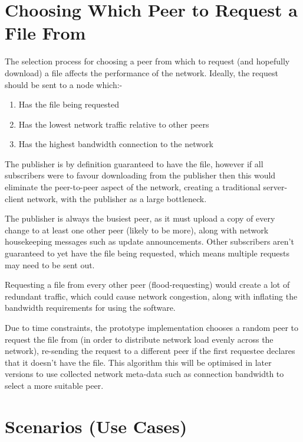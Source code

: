 \documentclass[12pt,a4paper,]{adreport}
\begin{document}
\section{Choosing Which Peer to Request a File
From}\label{choosing-which-peer-to-request-a-file-from}

The selection process for choosing a peer from which to request (and
hopefully download) a file affects the performance of the network.
Ideally, the request should be sent to a node which:-

\begin{enumerate}
\def\labelenumi{\arabic{enumi}.}
\itemsep1pt\parskip0pt
\item
  Has the file being requested
\item
  Has the lowest network traffic relative to other peers
\item
  Has the highest bandwidth connection to the network
\end{enumerate}

The publisher is by definition guaranteed to have the file, however if
all subscribers were to favour downloading from the publisher then this
would eliminate the peer-to-peer aspect of the network, creating a
traditional server-client network, with the publisher as a large
bottleneck.

The publisher is always the busiest peer, as it must upload a copy of
every change to at least one other peer (likely to be more), along with
network housekeeping messages such as update announcements. Other
subscribers aren't guaranteed to yet have the file being requested,
which means multiple requests may need to be sent out.

Requesting a file from every other peer (flood-requesting) would create
a lot of redundant traffic, which could cause network congestion, along
with inflating the bandwidth requirements for using the software.

Due to time constraints, the prototype implementation chooses a random
peer to request the file from (in order to distribute network load
evenly across the network), re-sending the request to a different peer
if the first requestee declares that it doesn't have the file. This
algorithm this will be optimised in later versions to use collected
network meta-data such as connection bandwidth to select a more suitable
peer.

\section{Scenarios (Use Cases)}\label{scenarios-use-cases}
\end{document}
